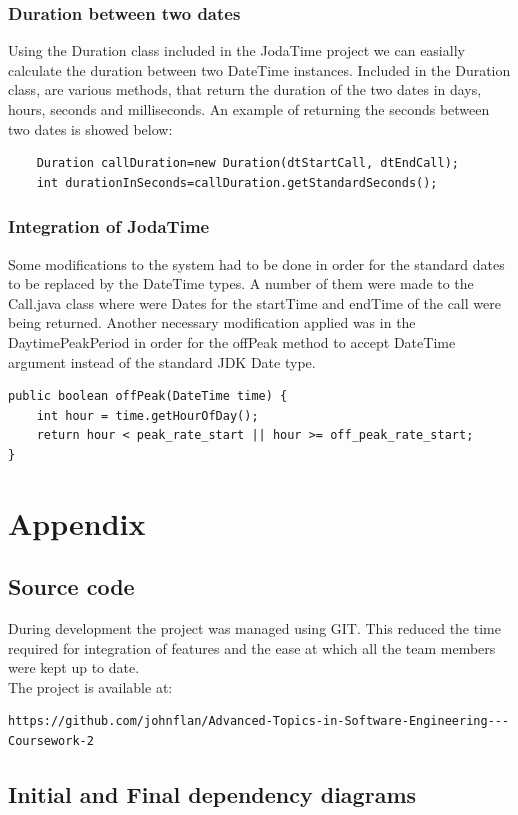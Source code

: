 \documentclass[pdftex,11pt,a4paper]{article}
\begin{document}
\subsubsection{Duration between two dates}
Using the Duration class included in the JodaTime project we can easially calculate the duration between two DateTime instances. Included in the Duration class, are various methods, that return the duration of the two dates in days, hours, seconds and milliseconds. An example of returning the seconds between two dates is showed below:
\begin{lstlisting}
	Duration callDuration=new Duration(dtStartCall, dtEndCall);
	int durationInSeconds=callDuration.getStandardSeconds();
\end{lstlisting}

\subsubsection{Integration of JodaTime}
Some modifications to the system had to be done in order for the standard dates to be replaced by the DateTime types. A number of them were made to the Call.java class where were Dates for the startTime and endTime of the call were being returned. Another necessary modification applied was in the DaytimePeakPeriod in order for the offPeak method to accept DateTime argument instead of the standard JDK Date type.
\begin{lstlisting}
public boolean offPeak(DateTime time) {     
	int hour = time.getHourOfDay();
	return hour < peak_rate_start || hour >= off_peak_rate_start;
}
\end{lstlisting}
\section{Appendix}

\subsection{Source code}
During development the project was managed using GIT. This reduced the time required for integration of features and the ease at which all the team members were kept up to date.\\
The project is available at:
\begin{lstlisting}
https://github.com/johnflan/Advanced-Topics-in-Software-Engineering---Coursework-2
\end{lstlisting}

\subsection{Initial and Final dependency diagrams}
\end{document}

